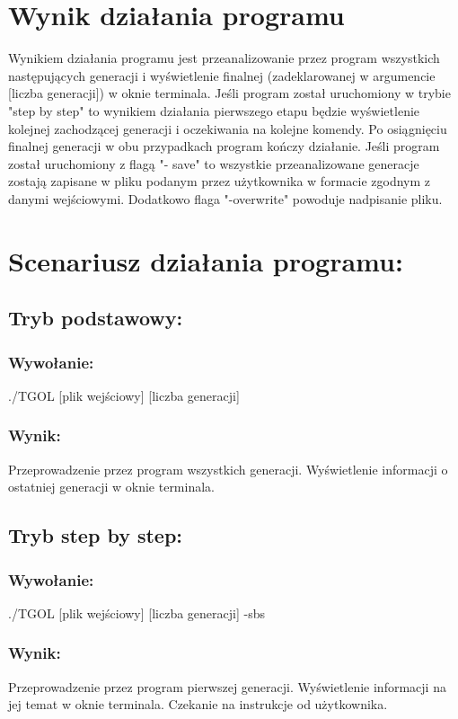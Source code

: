 \documentclass[11pt,a4paper]{report}
\begin{document}
\section{Wynik działania programu}\label{sec:teskt}
Wynikiem działania programu jest przeanalizowanie przez program wszystkich następujących generacji i wyświetlenie finalnej (zadeklarowanej w argumencie [liczba generacji]) w oknie terminala.
Jeśli program został uruchomiony w trybie "step by step" to wynikiem działania pierwszego etapu będzie wyświetlenie kolejnej zachodzącej generacji i oczekiwania na kolejne komendy.
Po osiągnięciu finalnej generacji w obu przypadkach program kończy działanie. Jeśli program został uruchomiony z flagą "- save" to wszystkie przeanalizowane generacje zostają zapisane w pliku podanym przez użytkownika w formacie zgodnym z danymi wejściowymi. Dodatkowo flaga "-overwrite" powoduje nadpisanie pliku. 

\section{Scenariusz działania programu:}\label{sec:teskt}
\subsection {Tryb podstawowy:}
\subsubsection {Wywołanie:}
		./TGOL [plik wejściowy] [liczba generacji] \\
\subsubsection {Wynik:}
		Przeprowadzenie przez program wszystkich generacji. Wyświetlenie informacji o ostatniej generacji w oknie terminala.\\

\subsection {Tryb step by step:}
\subsubsection {Wywołanie:}
		./TGOL [plik wejściowy] [liczba generacji] -sbs\\
\subsubsection {Wynik:}
		Przeprowadzenie przez program pierwszej generacji. Wyświetlenie informacji na jej temat w oknie terminala. Czekanie na instrukcje od użytkownika.\\
\end{document}
